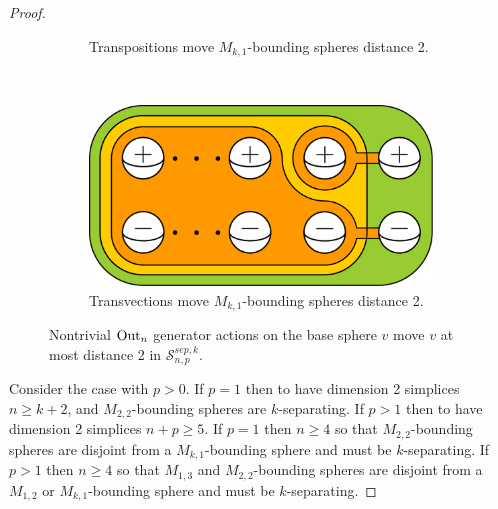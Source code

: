 \begin{proof}
\begin{figure}[b!]
\begin{subfigure}[b]{0.4\textwidth}
        \caption{Transpositions move $M_{k,1}$-bounding spheres distance 2.}
        \label{fig:kput0}
    \end{subfigure}
    ~
    \begin{subfigure}[b]{0.4\textwidth}
        \includegraphics[width=\textwidth]{figures/kput1.pdf}
        \caption{Transvections move $M_{k,1}$-bounding spheres distance 2.}
        \label{fig:kput1}
    \end{subfigure}
    \caption{Nontrivial $\operatorname{Out}_{n}$ generator actions on the base sphere $v$
    move $v$ at most distance 2 in $\mathcal S^{sep,k}_{n,p}$.}
    \label{fig:kput01}
\end{figure}

Consider the case with $p>0$.
If
$p=1$
then to have dimension 2 simplices $n \geq k+2$,
and $M_{2,2}$-bounding spheres are $k$-separating.
If
$p>1$
then to have dimension 2 simplices $n+p\geq 5$.
If $p=1$ then $n \geq 4$
so that $M_{2,2}$-bounding spheres are disjoint from a
$M_{k,1}$-bounding sphere and must be $k$-separating.
If $p>1$ then $n \geq 4$
so that $M_{1,3}$ and $M_{2,2}$-bounding spheres are disjoint from a
$M_{1,2}$ or $M_{k,1}$-bounding sphere and must be $k$-separating.



\end{proof}
